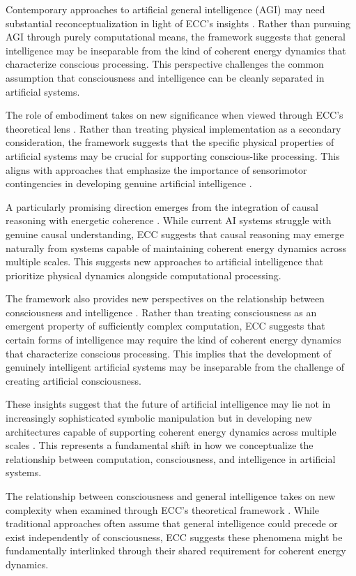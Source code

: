 \begin{refsection}
Contemporary approaches to artificial general intelligence (AGI) may need substantial reconceptualization in light of ECC's insights \cite{Goertzel2007}. Rather than pursuing AGI through purely computational means, the framework suggests that general intelligence may be inseparable from the kind of coherent energy dynamics that characterize conscious processing. This perspective challenges the common assumption that consciousness and intelligence can be cleanly separated in artificial systems.

The role of embodiment takes on new significance when viewed through ECC's theoretical lens \cite{Kurzweil2012}. Rather than treating physical implementation as a secondary consideration, the framework suggests that the specific physical properties of artificial systems may be crucial for supporting conscious-like processing. This aligns with approaches that emphasize the importance of sensorimotor contingencies in developing genuine artificial intelligence \cite{ORegan2011}.

A particularly promising direction emerges from the integration of causal reasoning with energetic coherence \cite{Pearl2018}. While current AI systems struggle with genuine causal understanding, ECC suggests that causal reasoning may emerge naturally from systems capable of maintaining coherent energy dynamics across multiple scales. This suggests new approaches to artificial intelligence that prioritize physical dynamics alongside computational processing.

The framework also provides new perspectives on the relationship between consciousness and intelligence \cite{Searle2004}. Rather than treating consciousness as an emergent property of sufficiently complex computation, ECC suggests that certain forms of intelligence may require the kind of coherent energy dynamics that characterize conscious processing. This implies that the development of genuinely intelligent artificial systems may be inseparable from the challenge of creating artificial consciousness.

These insights suggest that the future of artificial intelligence may lie not in increasingly sophisticated symbolic manipulation but in developing new architectures capable of supporting coherent energy dynamics across multiple scales \cite{Tegmark2017}. This represents a fundamental shift in how we conceptualize the relationship between computation, consciousness, and intelligence in artificial systems.

The relationship between consciousness and general intelligence takes on new complexity when examined through ECC's theoretical framework \cite{Tononi2015}. While traditional approaches often assume that general intelligence could precede or exist independently of consciousness, ECC suggests these phenomena might be fundamentally interlinked through their shared requirement for coherent energy dynamics.


\end{refsection}
